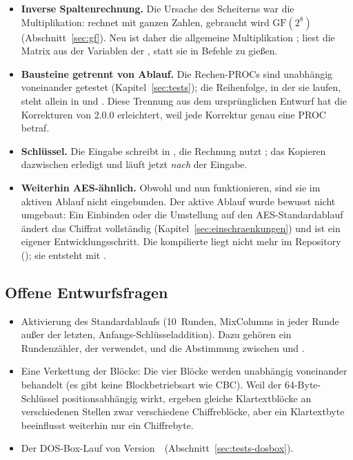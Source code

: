 \begin{itemize}[noitemsep]
    \item \textbf{Inverse Spaltenrechnung.} Die Ursache des Scheiterns war die Multiplikation:  rechnet mit ganzen Zahlen, gebraucht wird $\mathrm{GF}(2^8)$ (Abschnitt~\ref{sec:gf}). Neu ist daher die allgemeine Multiplikation ;  liest die Matrix aus der Variablen  der , statt sie in Befehle zu gießen.
    \item \textbf{Bausteine getrennt von Ablauf.} Die Rechen-PROCs sind unabhängig voneinander getestet (Kapitel~\ref{sec:tests}); die Reihenfolge, in der sie laufen, steht allein in  und . Diese Trennung aus dem ursprünglichen Entwurf hat die Korrekturen von 2.0.0 erleichtert, weil jede Korrektur genau eine PROC betraf.
    \item \textbf{Schlüssel.} Die Eingabe schreibt in , die Rechnung nutzt ; das Kopieren dazwischen erledigt  und läuft jetzt \emph{nach} der Eingabe.
    \item \textbf{Weiterhin AES-ähnlich.} Obwohl  und  nun funktionieren, sind sie im aktiven Ablauf nicht eingebunden. Der aktive Ablauf wurde bewusst nicht umgebaut: Ein Einbinden oder die Umstellung auf den AES-Standardablauf ändert das Chiffrat vollständig (Kapitel~\ref{sec:einschraenkungen}) und ist ein eigener Entwicklungsschritt. Die kompilierte  liegt nicht mehr im Repository (); sie entsteht mit .
\end{itemize}

\subsection{Offene Entwurfsfragen}
\begin{itemize}[noitemsep]
    \item Aktivierung des Standardablaufs (10~Runden, MixColumns in jeder Runde außer der letzten, Anfangs-Schlüsseladdition). Dazu gehören ein Rundenzähler, der  verwendet, und die Abstimmung zwischen  und .
    \item Eine Verkettung der Blöcke: Die vier Blöcke werden unabhängig voneinander behandelt (es gibt keine Blockbetriebsart wie CBC). Weil der 64-Byte-Schlüssel positionsabhängig wirkt, ergeben gleiche Klartextblöcke an verschiedenen Stellen zwar verschiedene Chiffreblöcke, aber ein Klartextbyte beeinflusst weiterhin nur ein Chiffrebyte.
    \item Der DOS-Box-Lauf von Version~\versionProjekt\ (Abschnitt~\ref{sec:tests-dosbox}).
\end{itemize}
